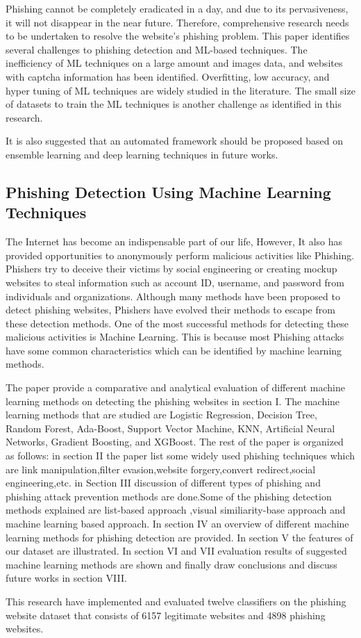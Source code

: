 Phishing cannot be completely eradicated in a day, and due to its pervasiveness, it will not disappear in the near future. Therefore, comprehensive research needs to be undertaken to resolve the website's phishing problem. This paper identifies several challenges to phishing detection and ML-based techniques. The inefficiency of ML techniques on a large amount and images data, and websites with captcha information has been identified. Overfitting, low accuracy, and hyper tuning of ML techniques are widely studied in the literature. The small size of datasets to train the ML techniques is another challenge as identified in this research.

It is also suggested that an automated framework should be proposed based on ensemble learning and deep learning techniques in future works.

\subsection{Phishing Detection Using Machine Learning
Techniques}

The Internet has become an indispensable part of our life, However, It also has provided opportunities to anonymously perform malicious activities like Phishing. Phishers try to deceive their victims by social engineering or creating mockup websites to steal information such as account ID, username, and password from individuals and organizations. Although many methods have been proposed to detect phishing websites, Phishers have evolved their methods to escape from these detection methods. One of the most successful methods for detecting these malicious activities is Machine Learning. This is because most Phishing attacks have some common characteristics which can be identified by machine learning methods.

The paper provide a comparative and analytical evaluation of different machine learning methods on detecting the phishing websites in section I. The machine learning methods that are studied are Logistic Regression, Decision Tree, Random Forest, Ada-Boost, Support Vector Machine, KNN, Artificial Neural Networks, Gradient Boosting, and XGBoost. The rest of the paper is organized as follows: in section II the paper list some widely used phishing techniques which are link manipulation,filter evasion,website forgery,convert redirect,social engineering,etc. in Section III discussion of different types of phishing and phishing attack prevention methods are done.Some of the phishing detection methods explained are list-based approach ,visual similiarity-base approach and machine learning based approach. In section IV an overview of different machine learning methods for phishing detection are provided. In section V  the features of our dataset are illustrated. In section VI and VII  evaluation results of suggested machine learning methods are shown and finally draw conclusions and discuss future works in section VIII.

 This research have implemented and evaluated twelve classifiers on the phishing website dataset that consists of 6157 legitimate websites and 4898 phishing websites.

